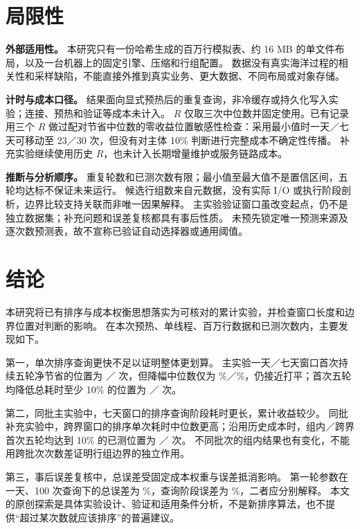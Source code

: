 \documentclass[UTF8,a4paper,zihao=-4,fontset=none]{ctexart}
\newcommand{\pct}{\%}
\begin{document}


\section{局限性}
\label{sec:limits}
\textbf{外部适用性。}
本研究只有一份哈希生成的百万行模拟表、约 16 MB 的单文件布局，以及一台机器上的固定引擎、压缩和行组配置。
数据没有真实海洋过程的相关性和采样缺陷，不能直接外推到真实业务、更大数据、不同布局或对象存储。

\textbf{计时与成本口径。}
结果面向显式预热后的重复查询，非冷缓存或持久化写入实验；连接、预热和验证等成本未计入。
$R$ 仅取三次中位数并固定使用。已有记录用三个 $R$ 做过配对节省中位数的零收益位置敏感性检查：采用最小值时一天／七天可移动至 23／30 次，但没有对主体 10\pct{} 判断进行完整成本不确定性传播。
补充实验继续使用历史 $R$，也未计入长期增量维护或服务链路成本。

\textbf{推断与分析顺序。}
重复轮数和已测次数有限；最小值至最大值不是置信区间，五轮均达标不保证未来运行。
候选行组数来自元数据，没有实际 I/O 或执行阶段剖析，边界比较支持关联而非唯一因果解释。
主实验验证窗口虽改变起点，仍不是独立数据集；补充问题和误差复核都具有事后性质。
未预先锁定唯一预测来源及逐次数预测表，故不宣称已验证自动选择器或通用阈值。

\section{结论}
本研究将已有排序与成本权衡思想落实为可核对的累计实验，并检查窗口长度和边界位置对判断的影响。
在本次预热、单线程、百万行数据和已测次数内，主要发现如下。

第一，单次排序查询更快不足以证明整体更划算。
主实验一天／七天窗口首次持续五轮净节省的位置为 \MainOneNetN{}／\MainSevenNetN{} 次，但降幅中位数仅为
\MainOneNetPct\pct／\MainSevenNetPct\pct，仍接近打平；首次五轮均降低总耗时至少 10\pct{} 的位置为
\MainOneTenN{}／\MainSevenTenN{} 次。

第二，同批主实验中，七天窗口的排序查询阶段耗时更长，累计收益较少。
同批补充实验中，跨界窗口的排序单次耗时中位数更高；沿用历史成本时，组内／跨界首次五轮均达到 10\pct{} 的已测位置为
\SuppInsideAllN{}／\SuppCrossAllN{} 次。
不同批次的组内结果也有变化，不能用跨批次次数差证明行组边界的独立作用。

第三，事后误差复核中，总误差受固定成本权重与误差抵消影响。
第一轮参数在一天、100 次查询下的总误差为 \PilotOneDayOneHundredTotalErr\pct，查询阶段误差为
\PilotOneDayOneHundredQueryErr\pct，二者应分别解释。
本文的原创探索是具体实验设计、验证和适用条件分析，不是新排序算法，也不提供“超过某次数就应该排序”的普遍建议。
\end{document}

